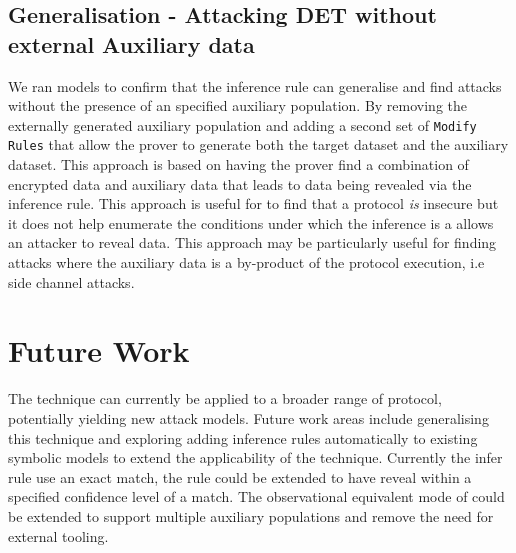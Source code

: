 \documentclass[journal]{IEEEtran}
\begin{document}
\subsection{Generalisation - Attacking DET without external Auxiliary data}
We ran models to confirm that the inference rule can generalise and find attacks without the presence of an specified auxiliary population. By removing the externally generated auxiliary population and adding a second set of \texttt{Modify Rules} that allow the prover to generate both the target dataset and the auxiliary dataset. This approach is based on having the prover find a combination of encrypted data and auxiliary data that leads to data being revealed via the inference rule. This approach is useful for to find that a protocol \textit{is} insecure but it does not help enumerate the conditions under which the inference is a allows an attacker to reveal data. This approach may be particularly useful for finding attacks where the auxiliary data is a by-product of the  protocol execution, i.e side channel attacks.

\section{Future Work}
The technique can currently be applied to a broader range of protocol, potentially yielding new attack models. Future work areas include generalising this technique and exploring adding inference rules automatically to existing symbolic models to extend the applicability of the technique. Currently the infer rule use an exact match, the rule could be extended to have reveal within a specified confidence level of a match. The observational equivalent mode of \tamarin{} could be extended to support multiple auxiliary populations and remove the need for external tooling. 




\end{document}
